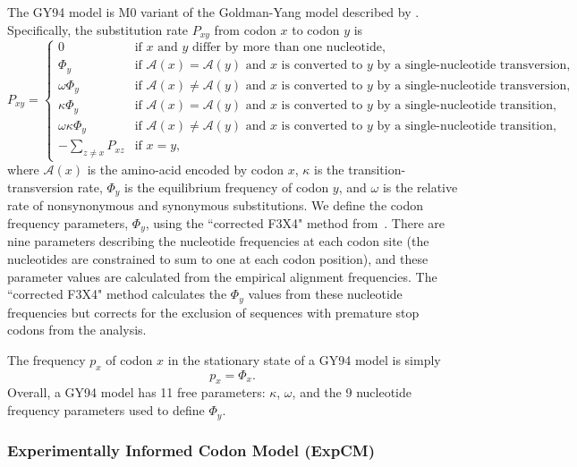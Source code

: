 \documentclass[11pt]{article}
\begin{document}
The GY94 model is M0 variant of the Goldman-Yang model described by \citet{yang2000codon}. 
Specifically, the substitution rate $P_{xy}$ from codon $x$ to codon $y$ is 
\begin{equation}
\label{eq:GY94}
P_{xy} = 
\begin{cases}
  0 & \mbox{if $x$ and $y$ differ by more than one nucleotide,}\\
  \Phi_y & \mbox{if $\mathcal{A}\left(x\right) = \mathcal{A}\left(y\right)$ and $x$ is converted to $y$ by a single-nucleotide transversion,} \\
  \omega \Phi_{y} & \mbox{if $\mathcal{A}\left(x\right) \ne \mathcal{A}\left(y\right)$ and $x$ is converted to $y$ by a single-nucleotide transversion,} \\
  \kappa \Phi_y & \mbox{if $\mathcal{A}\left(x\right) = \mathcal{A}\left(y\right)$ and $x$ is converted to $y$ by a single-nucleotide transition,} \\
  \omega \kappa \Phi_{y} & \mbox{if $\mathcal{A}\left(x\right) \ne \mathcal{A}\left(y\right)$ and $x$ is converted to $y$ by a single-nucleotide transition,} \\
  -\sum\limits_{z \ne x} P_{xz} & \mbox{if $x = y$,}
  \end{cases}
\end{equation}
where $\mathcal{A}\left(x\right)$ is the amino-acid encoded by codon $x$, $\kappa$ is the transition-transversion rate, $\Phi_y$ is the equilibrium frequency of codon $y$, and $\omega$ is the relative rate of nonsynonymous and synonymous substitutions.
We define the codon frequency parameters, $\Phi_y$, using the ``corrected F3X4" method from~\citet{pond2010correcting}. 
There are nine parameters describing the nucleotide frequencies at each codon site (the nucleotides are constrained to sum to one at each codon position),  and these parameter values are calculated from the empirical alignment frequencies. 
The ``corrected F3X4" method calculates the $\Phi_y$ values from these nucleotide frequencies but corrects for the exclusion of sequences with premature stop codons from the analysis. 

The frequency $p_x$ of codon $x$ in the stationary state of a GY94 model is simply 
\begin{equation}
\label{eq:px}
p_{x} = \Phi_x.
\end{equation}
Overall, a GY94 model has 11 free parameters: $\kappa$, $\omega$, and the 9 nucleotide frequency parameters used to define $\Phi_y$. 

\subsubsection*{Experimentally Informed Codon Model (ExpCM)}
\end{document}
